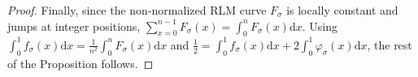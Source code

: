 \documentclass[10pt,a4paper]{amsart}
\DeclareMathOperator{\noninv}{noninv}
\begin{document}
\begin{proof}
%
%

    Finally, since the non-normalized RLM curve $F_\sigma$ is locally constant and jumps at integer positions,  
    $\sum_{x=0}^{n-1} F_\sigma(x)=\int_0^n F_\sigma(x) \mathrm{d}x$.
    Using $\int_0^1 f_\sigma(x) \mathrm{d}x = \frac{1}{n^2} \int_0^n F_\sigma(x) \mathrm{d}x$ and $\frac12 = \int_0^1 f_\sigma(x) \mathrm{d}x + 2\int_0^1 \varphi_\sigma(x) \mathrm{d}x$, the rest of the Proposition follows.
\end{proof}
\end{document}
